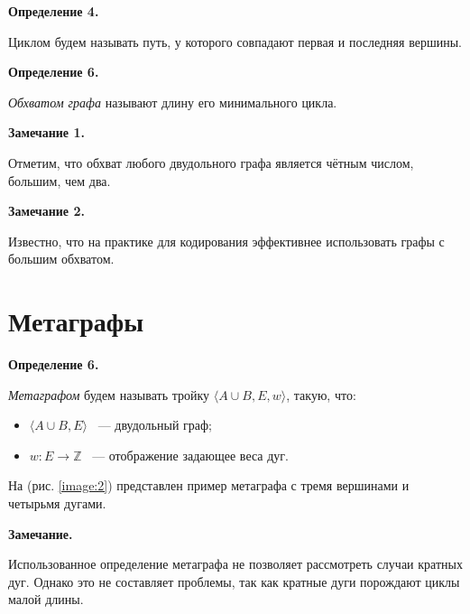 \documentclass[14pt]{mmcs-article}
\begin{document}
\textbf{Определение 4.}

Циклом будем называть путь, у которого совпадают первая и последняя вершины.

\textbf{Определение 6.}

\textsl{Обхватом графа} называют длину его минимального цикла.

\textbf{Замечание 1.}

Отметим, что обхват любого двудольного графа является чётным числом, большим, чем два.

\textbf{Замечание 2.}

Известно, что на практике для кодирования эффективнее использовать графы с большим обхватом.

\pagebreak
\section*{Метаграфы}

\textbf{Определение 6.}

\textsl{Метаграфом} будем называть тройку $\langle A \cup B,E,w \rangle$, такую, что:

\begin{itemize}
    \item $\langle A \cup B,E \rangle$ ~--- двудольный граф;
    \item $w: E \rightarrow \mathbb{Z}$ ~--- отображение задающее веса дуг.
\end{itemize}

На (рис. \ref{image:2}) представлен пример метаграфа с тремя вершинами и четырьмя дугами.


\textbf{Замечание.}

Использованное определение метаграфа не позволяет рассмотреть случаи кратных дуг. Однако это не составляет проблемы, так как кратные дуги порождают циклы малой длины.
\end{document}
